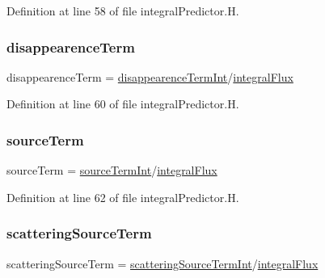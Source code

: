 Definition at line 58 of file integral\+Predictor.\+H.

\mbox{\label{integralPredictor_8H_af8dbaf3ece9644da11df447a12a14051}} 
\subsubsection{\texorpdfstring{disappearence\+Term}{disappearenceTerm}}
{\footnotesize\ttfamily disappearence\+Term = \hyperlink{integralPredictorSP3_8H_af3f24745c62331a2c7c7bd0dead37b6a}{disappearence\+Term\+Int}/\hyperlink{integralPredictorSP3_8H_a2a0b08b13037e807e2dd9a5db5f493fa}{integral\+Flux}}



Definition at line 60 of file integral\+Predictor.\+H.

\mbox{\label{integralPredictor_8H_a917a012199c77c70638448d199750771}} 
\subsubsection{\texorpdfstring{source\+Term}{sourceTerm}}
{\footnotesize\ttfamily source\+Term = \hyperlink{integralPredictorSP3_8H_ac69cf9b0ca49bbc73bbd8757cc3ebae3}{source\+Term\+Int}/\hyperlink{integralPredictorSP3_8H_a2a0b08b13037e807e2dd9a5db5f493fa}{integral\+Flux}}



Definition at line 62 of file integral\+Predictor.\+H.

\mbox{\label{integralPredictor_8H_a9aa913bf9329cc3ad657343f9e96ceeb}} 
\subsubsection{\texorpdfstring{scattering\+Source\+Term}{scatteringSourceTerm}}
{\footnotesize\ttfamily scattering\+Source\+Term = \hyperlink{integralPredictorSP3_8H_a6c06ef7a771d3996b52235080e43589b}{scattering\+Source\+Term\+Int}/\hyperlink{integralPredictorSP3_8H_a2a0b08b13037e807e2dd9a5db5f493fa}{integral\+Flux}}



